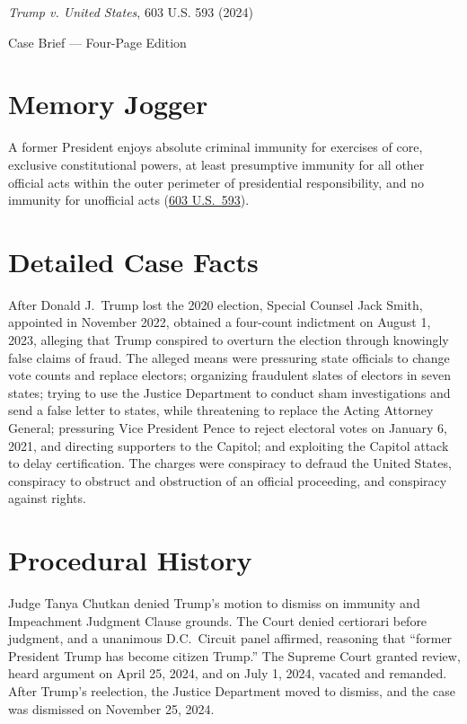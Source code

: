 \documentclass[12pt]{article}
\begin{document}
\begin{center}
{\LARGE \textit{Trump v. United States}, 603 U.S. 593 (2024)\par}
\vspace{0.8em}
{\large Case Brief --- Four-Page Edition\par}
\end{center}
\vspace{1em}

\section{Memory Jogger}

A former President enjoys absolute criminal immunity for exercises of core, exclusive constitutional powers, at least presumptive immunity for all other official acts within the outer perimeter of presidential responsibility, and no immunity for unofficial acts (\href{https://www.law.cornell.edu/supremecourt/text/23-939}{603 U.S.\ 593}).

\section{Detailed Case Facts}

After Donald J.\ Trump lost the 2020 election, Special Counsel Jack Smith, appointed in November 2022, obtained a four-count indictment on August 1, 2023, alleging that Trump conspired to overturn the election through knowingly false claims of fraud. The alleged means were pressuring state officials to change vote counts and replace electors; organizing fraudulent slates of electors in seven states; trying to use the Justice Department to conduct sham investigations and send a false letter to states, while threatening to replace the Acting Attorney General; pressuring Vice President Pence to reject electoral votes on January 6, 2021, and directing supporters to the Capitol; and exploiting the Capitol attack to delay certification. The charges were conspiracy to defraud the United States, conspiracy to obstruct and obstruction of an official proceeding, and conspiracy against rights.

\section{Procedural History}

Judge Tanya Chutkan denied Trump's motion to dismiss on immunity and Impeachment Judgment Clause grounds. The Court denied certiorari before judgment, and a unanimous D.C.\ Circuit panel affirmed, reasoning that ``former President Trump has become citizen Trump.'' The Supreme Court granted review, heard argument on April 25, 2024, and on July 1, 2024, vacated and remanded. After Trump's reelection, the Justice Department moved to dismiss, and the case was dismissed on November 25, 2024.
\end{document}
